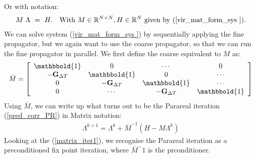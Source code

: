 Or with notation:
\begin{align}
M \ \Lambda \ = \ H.\quad \textrm{With $M\in\mathbb{R}^{N\times N},H\in\mathbb{R}^N$ given by (\ref{vir_mat_form_sys }).} \label{vir_mat_sys}
\end{align}
We can solve system (\ref{vir_mat_form_sys }) by sequentially applying the fine propagator, but we again want to use the coarse propagator, so that we can run the fine propagator in parallel. We first define the coarse equivalent to $M$ as:
\begin{align}
\bar{M} = \left[ \begin{array}{cccc}
   \mathbbold{1} & 0 & \cdots & 0 \\  
   -\bold{G}_{\Delta T} & \mathbbold{1} & 0 & \cdots \\ 
   0 &-\bold{G}_{\Delta T} & \mathbbold{1}  & \cdots \\
   0 &\cdots &-\bold{G}_{\Delta T} & \mathbbold{1}   \\
   \end{array}  \right]
\end{align}
Using $\bar{M}$, we can write up what turns out to be the Parareal iteration (\ref{pred_corr_PR}) in Matrix notation:
\begin{align}
\Lambda^{k+1} = \Lambda^k + \bar{M}^{-1}(H-M\Lambda^k) \label{matrix_iter1}
\end{align}
Looking at the (\ref{matrix_iter1}), we recognise the Parareal iteration as a preconditioned fix point iteration, where $\bar{M}^-1$ is the prconditioner.
